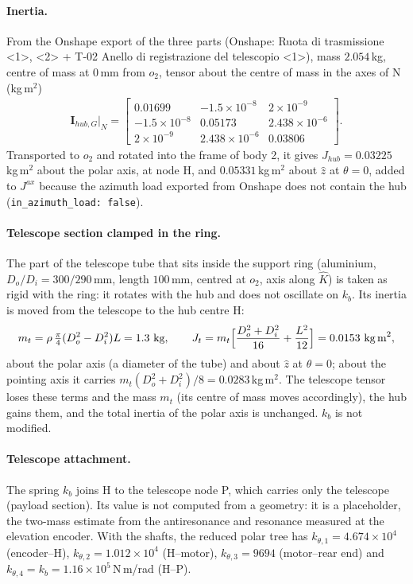 \documentclass[10pt,a4paper]{article}
\numberwithin{equation}{section}
\begin{document}
\paragraph{Inertia.} From the Onshape export of the three parts (Onshape: Ruota di trasmissione <1>, <2> + T-02 Anello di registrazione del telescopio <1>), mass $2.054$\,kg, centre of mass at $0$\,mm from $o_2$, tensor about the centre of mass in the axes of N (kg\,m$^2$)
\begin{gather}
\mathbf I_{hub,G}|_N = \begin{bmatrix}0.01699 & -1.5\times10^{-8} & 2\times10^{-9} \\ -1.5\times10^{-8} & 0.05173 & 2.438\times10^{-6} \\ 2\times10^{-9} & 2.438\times10^{-6} & 0.03806\end{bmatrix}.
\end{gather}
Transported to $o_2$ and rotated into the frame of body 2, it gives $J_{hub} = 0.03225$\,kg\,m$^2$ about the polar axis, at node H, and $0.05331$\,kg\,m$^2$ about $\hat z$ at $\theta = 0$, added to $J^{ax}$ because the azimuth load exported from Onshape does not contain the hub (\texttt{in\_azimuth\_load: false}).
\paragraph{Telescope section clamped in the ring.} The part of the telescope tube that sits inside the support ring (aluminium, $D_o/D_i = 300/290$\,mm, length $100$\,mm, centred at $o_2$, axis along $\hat K$) is taken as rigid with the ring: it rotates with the hub and does not oscillate on $k_b$. Its inertia is moved from the telescope to the hub centre H:\begin{gather}m_t = \rho\,\tfrac{\pi}{4}(D_o^2 - D_i^2)L = 1.3\ \text{kg},\qquad J_t = m_t\Bigl[\frac{D_o^2 + D_i^2}{16} + \frac{L^2}{12}\Bigr] = 0.0153\ \text{kg\,m}^2,\end{gather}about the polar axis (a diameter of the tube) and about $\hat z$ at $\theta = 0$; about the pointing axis it carries $m_t(D_o^2 + D_i^2)/8 = 0.0283$\,kg\,m$^2$. The telescope tensor loses these terms and the mass $m_t$ (its centre of mass moves accordingly), the hub gains them, and the total inertia of the polar axis is unchanged. $k_b$ is not modified.
\paragraph{Telescope attachment.} The spring $k_b$ joins H to the telescope node P, which carries only the telescope (payload section). Its value is not computed from a geometry: it is a placeholder, the two-mass estimate from the antiresonance and resonance measured at the elevation encoder. With the shafts, the reduced polar tree has $k_{\theta,1} = 4.674\times10^{4}$ (encoder--H), $k_{\theta,2} = 1.012\times10^{4}$ (H--motor), $k_{\theta,3} = 9694$ (motor--rear end) and $k_{\theta,4} = k_b = 1.16\times10^{5}$\,N\,m/rad (H--P).
\end{document}
